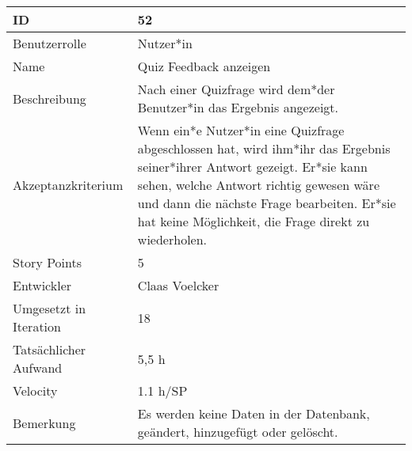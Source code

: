 \begin{tabularx}{\textwidth}{|p{}|X|}
	\hline
	ID & 52\\
	\hline
	Benutzerrolle & Nutzer*in\\
	\hline
	Name & Quiz Feedback anzeigen\\
	\hline
	Beschreibung & Nach einer Quizfrage wird dem*der Benutzer*in das Ergebnis angezeigt.\\
	\hline
	Akzeptanzkriterium & Wenn ein*e Nutzer*in eine Quizfrage abgeschlossen hat, wird ihm*ihr das Ergebnis seiner*ihrer Antwort gezeigt. Er*sie kann sehen, welche Antwort richtig gewesen wäre und dann die nächste Frage bearbeiten. Er*sie hat keine Möglichkeit, die Frage direkt zu wiederholen. \\
	\hline
	Story Points & 5\\
	\hline
	Entwickler & Claas Voelcker\\
	\hline
	Umgesetzt in Iteration & 18\\
	\hline
	Tatsächlicher Aufwand & 5,5 h\\
	\hline
	Velocity & 1.1 h/SP\\
	\hline
	Bemerkung & Es werden keine Daten in der Datenbank, geändert, hinzugefügt oder gelöscht.\\
	\hline
\end{tabularx}
\vspace{20pt}
